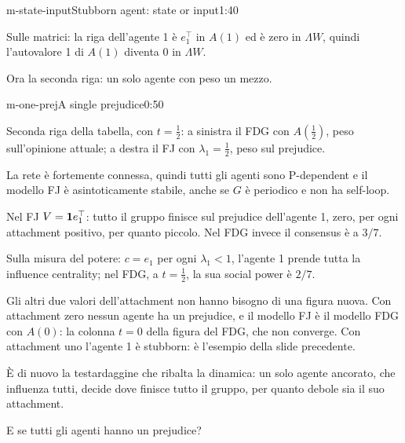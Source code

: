 \begin{slidedue}{m-state-input}{Stubborn agent: state or input}{1:40}
\begin{discorso}
    \item Sulle matrici: la riga dell'agente 1 è $e_1^\top$ in $A(1)$ ed è zero in $\Lambda W$, quindi l'autovalore 1 di $A(1)$ diventa 0 in $\Lambda W$.
    \item Ora la seconda riga: un solo agente con peso un mezzo.
  \end{discorso}
\end{slidedue}

\begin{slide}{m-one-prej}{A single prejudice}{0:50}
  \begin{discorso}
    \item Seconda riga della tabella, con $t=\tfrac12$: a sinistra il FDG con $A(\tfrac12)$, peso sull'opinione attuale; a destra il FJ con $\lambda_1=\tfrac12$, peso sul prejudice.
    \item La rete è fortemente connessa, quindi tutti gli agenti sono P-dependent e il modello FJ è asintoticamente stabile, anche se $G$ è periodico e non ha self-loop.
    \item Nel FJ $V=\mathbf{1} e_1^\top$: tutto il gruppo finisce sul prejudice dell'agente 1, zero, per ogni attachment positivo, per quanto piccolo. Nel FDG invece il consensus è a $3/7$.
    \item Sulla misura del potere: $c=e_1$ per ogni $\lambda_1<1$, l'agente 1 prende tutta la influence centrality; nel FDG, a $t=\tfrac12$, la sua social power è $2/7$.
    \item Gli altri due valori dell'attachment non hanno bisogno di una figura nuova. Con attachment zero nessun agente ha un prejudice, e il modello FJ è il modello FDG con $A(0)$: la colonna $t=0$ della figura del FDG, che non converge. Con attachment uno l'agente 1 è stubborn: è l'esempio della slide precedente.
    \item È di nuovo la testardaggine che ribalta la dinamica: un solo agente ancorato, che influenza tutti, decide dove finisce tutto il gruppo, per quanto debole sia il suo attachment.
    \item E se tutti gli agenti hanno un prejudice?
  \end{discorso}
\end{slide}

